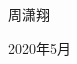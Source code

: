 \begin{thanks}








\begin{flushright}

~~~~周潇翔~~~~


~~~~2020年5月~~~~

\end{flushright}

\end{thanks}
